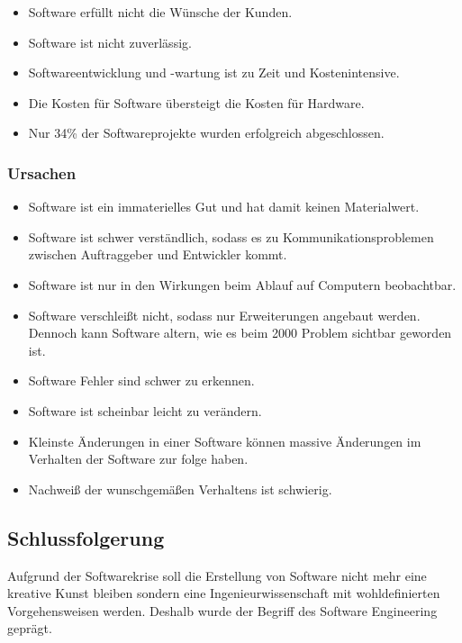 \documentclass[../main.tex]{subfiles}
\begin{document}
            \begin{itemize}
                \item Software erfüllt nicht die Wünsche der Kunden.
                \item Software ist nicht zuverlässig.
                \item Softwareentwicklung und -wartung ist zu Zeit und Kostenintensive.
                \item Die Kosten für Software übersteigt die Kosten für Hardware.
                \item Nur 34\% der Softwareprojekte wurden erfolgreich abgeschlossen.
            \end{itemize}
            
            \subsubsection{Ursachen}
                \begin{itemize}
                    \item Software ist ein immaterielles Gut und hat damit keinen Materialwert.
                    \item Software ist schwer verständlich, sodass es zu Kommunikationsproblemen zwischen Auftraggeber und Entwickler kommt.
                    \item Software ist nur in den Wirkungen beim Ablauf auf Computern beobachtbar.
                    \item Software verschleißt nicht, sodass nur Erweiterungen angebaut werden. Dennoch kann Software altern, wie es beim 2000 Problem sichtbar geworden ist.
                    \item Software Fehler sind schwer zu erkennen.
                    \item Software ist scheinbar leicht zu verändern.
                    \item Kleinste Änderungen in einer Software können massive Änderungen im Verhalten der Software zur folge haben.
                    \item Nachweiß der wunschgemäßen Verhaltens ist schwierig.
                \end{itemize}
                
            \subsection{Schlussfolgerung}
                Aufgrund der Softwarekrise soll die Erstellung von Software nicht mehr eine kreative Kunst bleiben sondern eine Ingenieurwissenschaft mit wohldefinierten Vorgehensweisen werden. Deshalb wurde der Begriff des Software Engineering geprägt.
                
\end{document}

